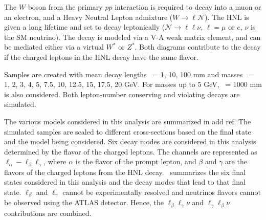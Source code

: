 The $W$ boson from the primary $pp$ interaction is required to decay into a muon or an electron, and a Heavy Neutral Lepton admixture ($W\to\ell\mathcal{N}$). The HNL is given a long lifetime and set to decay leptonically ($\mathcal{N}\to\ell\ell\nu$, $\ell=\mu$ or $e$, $\nu$ is the SM neutrino). The decay is modeled via a V-A weak matrix element, and can be mediated either via a virtual $W^*$ or $Z^*$. Both diagrams contribute to the decay if the charged leptons in the HNL decay have the same flavor.

Samples are created with mean decay lengths \ctau~= 1, 10, 100 mm and masses \mn~= 1, 2, 3, 4, 5, 7.5, 10, 12.5, 15, 17.5, 20 GeV. For masses up to 5 GeV, \ctau~= 1000 mm is also considered. Both lepton-number conserving and violating decays are simulated.

The various models considered in this analysis are summarized in {\color{red}add ref}. The simulated samples are scaled to different cross-sections based on the final state and the model being considered. Six decay modes are considered in this analysis determined by the flavor of the charged leptons. The channels are represented as $\ell_\alpha - \ell_\beta \ell_\gamma$, where $\alpha$ is the flavor of the prompt lepton, and $\beta$ and $\gamma$ are the flavors of the charged leptons from the HNL decay.~ summarizes the six final states considered in this analysis and the decay modes that lead to that final state. $\ell_\beta$ and $\ell_\gamma$ cannot be experimentally resolved and neutrinos flavors cannot be observed using the ATLAS detector. Hence, the $\ell_\beta\ell_\gamma\nu$ and $\ell_\gamma\ell_\beta\nu$ contributions are combined.


